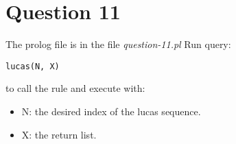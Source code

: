 \section{Question 11}

The prolog file is in the file \textit{question-11.pl}
Run query:
\begin{lstlisting}
lucas(N, X)
\end{lstlisting}
to call the rule and execute with:
\begin{itemize}
    \item N: the desired index of the lucas sequence.
    \item X: the return list.
\end{itemize}

